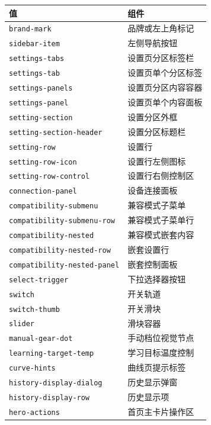 \documentclass[UTF8,11pt,a4paper]{ctexart}
\begin{document}
\begin{longtable}[]{@{}L{0.36\textwidth}L{0.58\textwidth}@{}}
\toprule\noalign{}
值 & 组件 \\
\midrule\noalign{}
\endhead
\bottomrule\noalign{}
\endlastfoot
\texttt{brand-mark} & 品牌或左上角标记 \\
\texttt{sidebar-item} & 左侧导航按钮 \\
\texttt{settings-tabs} & 设置页分区标签栏 \\
\texttt{settings-tab} & 设置页单个分区标签 \\
\texttt{settings-panels} & 设置页分区内容容器 \\
\texttt{settings-panel} & 设置页单个内容面板 \\
\texttt{setting-section} & 设置分区外框 \\
\texttt{setting-section-header} & 设置分区标题栏 \\
\texttt{setting-row} & 设置行 \\
\texttt{setting-row-icon} & 设置行左侧图标 \\
\texttt{setting-row-control} & 设置行右侧控制区 \\
\texttt{connection-panel} & 设备连接面板 \\
\texttt{compatibility-submenu} & 兼容模式子菜单 \\
\texttt{compatibility-submenu-row} & 兼容模式子菜单行 \\
\texttt{compatibility-nested} & 兼容模式嵌套内容 \\
\texttt{compatibility-nested-row} & 嵌套设置行 \\
\texttt{compatibility-nested-panel} & 嵌套控制面板 \\
\texttt{select-trigger} & 下拉选择器按钮 \\
\texttt{switch} & 开关轨道 \\
\texttt{switch-thumb} & 开关滑块 \\
\texttt{slider} & 滑块容器 \\
\texttt{manual-gear-dot} & 手动档位视觉节点 \\
\texttt{learning-target-temp} & 学习目标温度控制 \\
\texttt{curve-hints} & 曲线页提示标签 \\
\texttt{history-display-dialog} & 历史显示弹窗 \\
\texttt{history-display-row} & 历史显示项 \\
\texttt{hero-actions} & 首页主卡片操作区 \\
\end{longtable}
\end{document}
